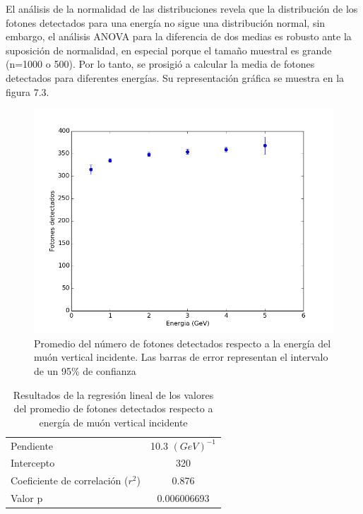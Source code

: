 \documentclass{book}
\begin{document}
El an\'alisis de la normalidad de las distribuciones revela que la distribuci\'on de los fotones detectados para una energ\'ia no sigue una distribuci\'on normal, sin embargo, el an\'alisis ANOVA para la diferencia de dos medias es robusto ante la suposici\'on de normalidad, en especial porque el tama\~no muestral es grande (n=1000 o 500). Por lo tanto, se prosigi\'o a calcular la media de fotones detectados para diferentes energ\'ias. Su representaci\'on gr\'afica se muestra en la figura 7.3.

\begin{figure}[h] %
\begin{center}
 \includegraphics[width=\linewidth]{DetectadosVsEnergia.png}
\caption{Promedio del n\'umero de fotones detectados respecto a la energ\'ia del mu\'on vertical incidente. Las barras de error representan el intervalo de un 95\% de confianza}
\end{center}
\end{figure}

\begin{table}[h]
\centering
\caption{ Resultados de la regresi\'on lineal de los valores del promedio de fotones detectados respecto a energ\'ia de mu\'on vertical incidente}
\begin{tabular}{l | c}
\hline
Pendiente & 10.3 $(GeV)^{-1}$ \\
Intercepto & 320 \\
Coeficiente de correlaci\'on ($r^2$) & 0.876 \\
Valor p & 0.006006693 \\

\hline
\end{tabular}
\end{table}
\end{document}
